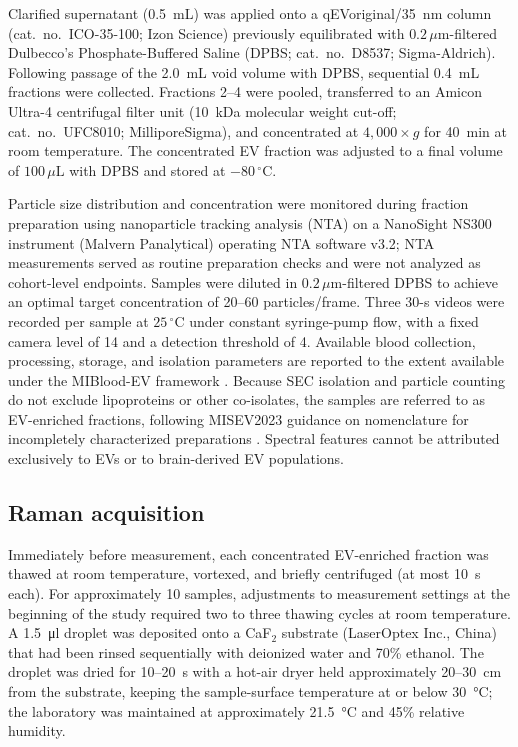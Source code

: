\documentclass[preprint,12pt]{elsarticle}
\begin{document}
Clarified supernatant (0.5~mL) was applied onto a qEVoriginal/35~nm column (cat.\ no.\ ICO-35-100; Izon Science) previously equilibrated with $0.2\,\mu\text{m}$-filtered Dulbecco's Phosphate-Buffered Saline (DPBS; cat.\ no.\ D8537; Sigma-Aldrich). Following passage of the 2.0~mL void volume with DPBS, sequential 0.4~mL fractions were collected. Fractions 2--4 were pooled, transferred to an Amicon Ultra-4 centrifugal filter unit (10~kDa molecular weight cut-off; cat.\ no.\ UFC8010; MilliporeSigma), and concentrated at $4{,}000 \times g$ for 40~min at room temperature. The concentrated EV fraction was adjusted to a final volume of $100\,\mu\text{L}$ with DPBS and stored at $-80\,^\circ\text{C}$.

Particle size distribution and concentration were monitored during fraction preparation using nanoparticle tracking analysis (NTA) on a NanoSight NS300 instrument (Malvern Panalytical) operating NTA software v3.2; NTA measurements served as routine preparation checks and were not analyzed as cohort-level endpoints. Samples were diluted in $0.2\,\mu\text{m}$-filtered DPBS to achieve an optimal target concentration of 20--60 particles/frame. Three 30-s videos were recorded per sample at $25\,^\circ\text{C}$ under constant syringe-pump flow, with a fixed camera level of 14 and a detection threshold of 4. Available blood collection, processing, storage, and isolation parameters are reported to the extent available under the MIBlood-EV framework \cite{lucien2023}.
Because SEC isolation and particle counting do not exclude lipoproteins or other co-isolates, the samples are referred to as EV-enriched fractions, following MISEV2023 guidance on nomenclature for incompletely characterized preparations \cite{welsh2024}. Spectral features cannot be attributed exclusively to EVs or to brain-derived EV populations.

\subsection{Raman acquisition} 
\label{subsec:acquisition}

Immediately before measurement, each concentrated EV-enriched fraction was thawed at room temperature, vortexed, and briefly centrifuged (at most 10~s each). For approximately 10 samples, adjustments to measurement settings at the beginning of the study required two to three thawing cycles at room temperature. A 1.5~\si{\micro\litre} droplet was deposited onto a CaF$_2$ substrate (LaserOptex Inc., China) that had been rinsed sequentially with deionized water and 70\% ethanol. The droplet was dried for 10--20~s with a hot-air dryer held approximately 20--30~cm from the substrate, keeping the sample-surface temperature at or below 30~\si{\degreeCelsius}; the laboratory was maintained at approximately 21.5~\si{\degreeCelsius} and 45\% relative humidity.
\end{document}
